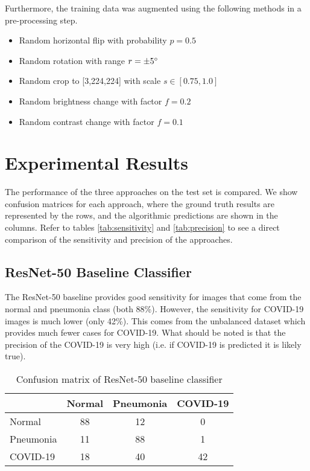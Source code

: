\documentclass[conference]{IEEEtran}
\begin{document}
Furthermore, the training data was augmented using the following methods in a pre-processing step. 
\begin{itemize}
	\item Random horizontal flip with probability $p=0.5$
	\item Random rotation with range $r=\pm 5 \degree$
	\item Random crop to [3,224,224] with scale $s \in [0.75, 1.0]$
	\item Random brightness change with factor $f=0.2$
	\item Random contrast change with factor $f=0.1$
\end{itemize}

\label{chap4_results}
\section{Experimental Results}

The performance of the three approaches on the test set is compared. We show confusion matrices for each approach, where the ground truth results are represented by the rows, and the algorithmic predictions are shown in the columns. Refer to tables \ref{tab:sensitivity} and \ref{tab:precision} to see a direct comparison of the sensitivity and precision of the approaches. 

\subsection{ResNet-50 Baseline Classifier}

The ResNet-50 baseline provides good sensitivity for images that come from the normal and pneumonia class (both 88\%). However, the sensitivity for COVID-19 images is much lower (only 42\%). This comes from the unbalanced dataset which provides much fewer cases for COVID-19.  What should be noted is that the precision of the COVID-19 is very high (i.e. if COVID-19 is predicted it is likely true).

\begin{table}[h]
\centering
\caption{Confusion matrix of ResNet-50 baseline classifier}
\begin{tabular}{|l|c|c|c|}
\hline
 & Normal & Pneumonia & COVID-19 \\ \hline
Normal & 88 & 12 & 0 \\ \hline
Pneumonia & 11 & 88 & 1 \\ \hline
COVID-19 & 18 & 40 & 42 \\ \hline
\end{tabular}
\label{tab:resnet_conf}
\end{table}
\end{document}
